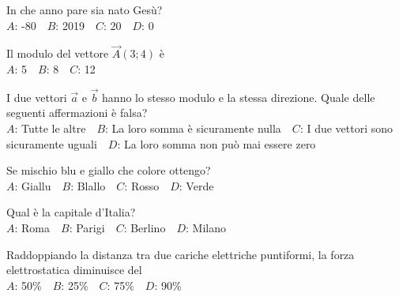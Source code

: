 \def\mcquestionnumber{7}


\mcquestionheader In che anno pare sia nato Gesù?\\
{$A$}: -80\ \ {$B$}: 2019\ \ {$C$}: 20\ \ {$D$}: 0\ \ 

\mcquestionfooter



\def\mcquestionnumber{8}


\mcquestionheader Il modulo del vettore $\vec{A}(3;4)$ è\\
{$A$}: 5\ \ {$B$}: 8\ \ {$C$}: 12\ \ 

\mcquestionfooter



\def\mcquestionnumber{9}


\mcquestionheader I due vettori $\vec{a}$ e $\vec{b}$ hanno lo stesso modulo e la stessa direzione. Quale delle seguenti affermazioni è falsa?\\
{$A$}: Tutte le altre\ \ {$B$}: La loro somma è sicuramente nulla\ \ {$C$}: I due vettori sono sicuramente uguali\ \ {$D$}: La loro somma non può mai essere zero\ \ 

\mcquestionfooter



\def\mcquestionnumber{10}


\mcquestionheader Se mischio blu e giallo che colore ottengo?\\
{$A$}: Giallu\ \ {$B$}: Blallo\ \ {$C$}: Rosso\ \ {$D$}: Verde\ \ 

\mcquestionfooter



\def\mcquestionnumber{11}


\mcquestionheader Qual è la capitale d’Italia?\\
{$A$}: Roma\ \ {$B$}: Parigi\ \ {$C$}: Berlino\ \ {$D$}: Milano\ \ 

\mcquestionfooter



\def\mcquestionnumber{12}


\mcquestionheader Raddoppiando la distanza tra due cariche elettriche puntiformi, la forza elettrostatica diminuisce del\\
{$A$}: 50\%\ \ {$B$}: 25\%\ \ {$C$}: 75\%\ \ {$D$}: 90\%\ \ 

\mcquestionfooter



\mcpaperfooter

\def\mcserialnumber{17}
\mcpaperheader


\def\mcquestionnumber{1}


